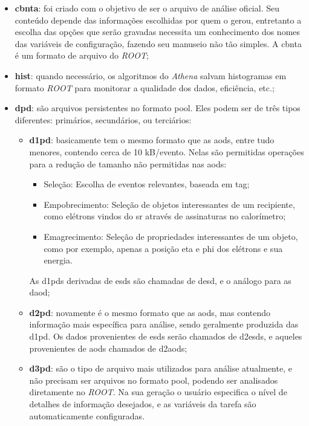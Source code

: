 \begin{itemize}
\item \textbf{\gls{cbnta}}: foi criado com o objetivo de ser o arquivo de
análise oficial. Seu conteúdo depende das informações escolhidas por quem o
gerou, entretanto a escolha das opções que serão gravadas necessita um
conhecimento dos nomes das variáveis de configuração, fazendo seu manuseio não
tão simples. A \gls{cbnta} é um formato de arquivo do \emph{ROOT};
\item \textbf{\gls{hist}}: quando necessário, os algoritmos do \emph{Athena} salvam
histogramas em formato \emph{ROOT} para monitorar a qualidade dos dados, eficiência, etc.;
\item \textbf{\gls{dpd}}: são arquivos persistentes no formato \gls{pool}. Eles
podem ser de três tipos diferentes: primários, secundários, ou terciários:
\begin{itemize}
\item \textbf{\gls{d1pd}}: basicamente tem o mesmo formato que as \glspl{aod},
entre tudo menores, contendo cerca de 10 kB/evento. Nelas são permitidas operações para
a redução de tamanho não permitidas nas \glspl{aod}:
\begin{itemize}
\item Seleção: Escolha de eventos relevantes, baseada em \gls{tag};
\item Empobrecimento: Seleção de objetos interessantes de um recipiente,
como elétrons vindos do \glsdesc{sr} através de assinaturas no
calorímetro;
\item Emagrecimento: Seleção de propriedades interessantes de um objeto, como
por exemplo, apenas a posição \gls{eta} e \gls{phi} dos elétrons e sua energia.
\end{itemize}
As \glspl{d1pd} derivadas de \glspl{esd} são chamadas de \gls{desd}, e o
análogo para as \gls{daod};
\item \textbf{\gls{d2pd}}: novamente é o mesmo formato que as \glspl{aod}, mas
contendo informação mais específica para análise, sendo geralmente produzida das
\gls{d1pd}. Os dados provenientes de \glspl{esd} serão chamados de
\glspl{d2esd}, e aqueles provenientes de \glspl{aod} chamados de
\glspl{d2aod};
\item \textbf{\gls{d3pd}}: são o tipo de arquivo mais utilizados para análise
atualmente, e não precisam ser arquivos no formato \gls{pool}, podendo ser
analisados diretamente no \emph{ROOT}. Na sua geração o
usuário especifica o nível de detalhes de informação desejados, e as variáveis
da tarefa são automaticamente configuradas.
\end{itemize}
\end{itemize}

